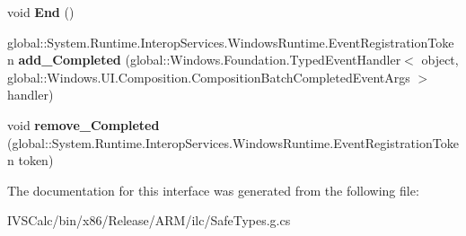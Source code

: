 \begin{DoxyCompactItemize}
void {\bfseries End} ()
\item 
\mbox{\label{interface_windows_1_1_u_i_1_1_composition_1_1_i_composition_scoped_batch_a8e6184255ede7485bdb1fd90fdc9b59c}} 
global\+::\+System.\+Runtime.\+Interop\+Services.\+Windows\+Runtime.\+Event\+Registration\+Token {\bfseries add\+\_\+\+Completed} (global\+::\+Windows.\+Foundation.\+Typed\+Event\+Handler$<$ object, global\+::\+Windows.\+U\+I.\+Composition.\+Composition\+Batch\+Completed\+Event\+Args $>$ handler)
\item 
\mbox{\label{interface_windows_1_1_u_i_1_1_composition_1_1_i_composition_scoped_batch_af4baa58c0bffd46f656f3fd7c4b1fdca}} 
void {\bfseries remove\+\_\+\+Completed} (global\+::\+System.\+Runtime.\+Interop\+Services.\+Windows\+Runtime.\+Event\+Registration\+Token token)
\end{DoxyCompactItemize}


The documentation for this interface was generated from the following file\+:\begin{DoxyCompactItemize}
\item 
I\+V\+S\+Calc/bin/x86/\+Release/\+A\+R\+M/ilc/Safe\+Types.\+g.\+cs\end{DoxyCompactItemize}
